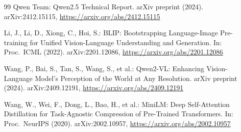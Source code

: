 \documentclass[runningheads]{llncs}
\begin{document}
\begin{thebibliography}{99}
Qwen Team: Qwen2.5 Technical Report. arXiv preprint (2024). arXiv:2412.15115, \url{https://arxiv.org/abs/2412.15115}

Li, J., Li, D., Xiong, C., Hoi, S.: BLIP: Bootstrapping Language-Image Pre-training for Unified Vision-Language Understanding and Generation. In: Proc.\ ICML (2022). arXiv:2201.12086, \url{https://arxiv.org/abs/2201.12086}

Wang, P., Bai, S., Tan, S., Wang, S., et al.: Qwen2-VL: Enhancing Vision-Language Model's Perception of the World at Any Resolution. arXiv preprint (2024). arXiv:2409.12191, \url{https://arxiv.org/abs/2409.12191}

Wang, W., Wei, F., Dong, L., Bao, H., et al.: MiniLM: Deep Self-Attention Distillation for Task-Agnostic Compression of Pre-Trained Transformers. In: Proc.\ NeurIPS (2020). arXiv:2002.10957, \url{https://arxiv.org/abs/2002.10957}

\end{thebibliography}
\end{document}
